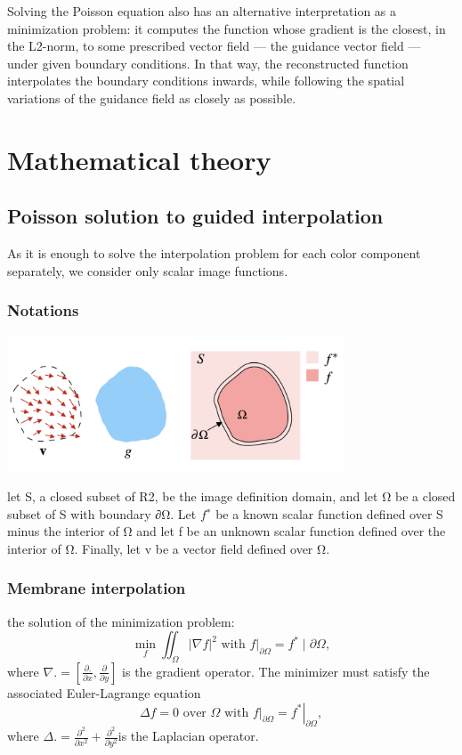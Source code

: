 \documentclass[10pt, a4paper]{article}%
\begin{document}
Solving the Poisson equation also has an alternative interpretation as a minimization problem: it computes the function whose gradient is the closest, in the L2-norm, to some prescribed vector field — the guidance vector field — under given boundary conditions. In that way, the reconstructed function interpolates the boundary conditions inwards, while following the spatial variations of the guidance field as closely as possible.
\section{Mathematical theory}
\subsection{Poisson solution to guided interpolation}
As it is enough to solve the interpolation problem for each color component separately, we consider only scalar image functions. 
\subsubsection{Notations}
\begin{center}
    \includegraphics[width = 10cm]{notation.jpg}
\end{center}

let S, a closed subset of R2, be the image definition domain, and let Ω be a closed subset of S with boundary ∂Ω. Let $f^∗$  be a known scalar function defined over S minus the interior of Ω and let f be an unknown scalar function defined over the interior of Ω. Finally, let v be a vector field defined over Ω.
\subsubsection{Membrane interpolation}
 the solution of the minimization problem:
 \begin{equation}
      \min _f \iint_{\Omega}|\nabla f|^2 \text { with }\left.f\right|_{\partial \Omega}=f^* \mid \partial \Omega,
 \end{equation}
 where $\nabla .=\left[\frac{\partial .}{\partial x}, \frac{\partial}{\partial y}\right]$ is the gradient operator. The minimizer must satisfy the associated Euler-Lagrange equation
 \begin{equation}
     \Delta f=0 \text { over } \Omega \text { with }\left.f\right|_{\partial \Omega}=\left.f^*\right|_{\partial \Omega},
 \end{equation}
 where $\Delta .=\frac{\partial^2}{\partial x^2}+\frac{\partial^2}{\partial y^2}$is the Laplacian operator.
\end{document}
